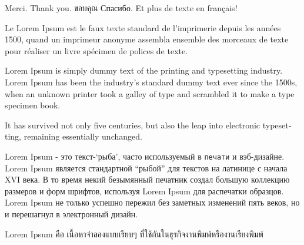 \documentclass[12pt]{article}
\begin{document}
\begin{abstract}
Le Lorem Ipsum est simplement du faux texte employé dans la composition et la mise en page avant impression.
\end{abstract}
 
Merci. \foreignlanguage{english}{Thank you.} \foreignlanguage{thai}{ขอบคุณ} \foreignlanguage{russian}{Спасибо.} Et plus de
texte en français!
 
Le Lorem Ipsum est le faux texte standard de l'imprimerie depuis les années 1500, quand un imprimeur anonyme assembla ensemble des morceaux de texte pour réaliser un livre spécimen de polices de texte.

\begin{otherlanguage}{english}
Lorem Ipsum is simply dummy text of the printing and typesetting industry. Lorem Ipsum has been the industry's standard dummy text ever since the 1500s, when an unknown printer took a galley of type and scrambled it to make a type specimen book. 

It has survived not only five centuries, but also the leap into electronic typesetting, remaining essentially unchanged. \end{otherlanguage}
 
\begin{otherlanguage}{russian}
Lorem Ipsum - это текст-`\textsf{рыба}', часто используемый в \texttt{печати} и вэб-дизайне. Lorem Ipsum является стандартной ``рыбой'' для текстов на латинице с начала XVI века. В то время некий безымянный печатник создал большую коллекцию размеров и форм шрифтов, используя Lorem Ipsum для распечатки образцов. Lorem Ipsum не только успешно пережил без заметных изменений пять веков, но и перешагнул в электронный дизайн. \end{otherlanguage}
 
\begin{otherlanguage}{thai}
\foreignlanguage{english}{Lorem Ipsum} คือ เนื้อหาจำลองแบบเรียบๆ ที่ใช้กันในธุรกิจงานพิมพ์หรืองานเรียงพิมพ์
\end{otherlanguage}
\end{document}

